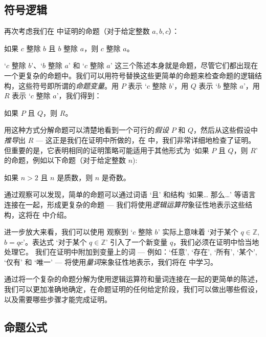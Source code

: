 \subsection*{符号逻辑}

再次考虑我们在  中证明的命题（对于给定整数 $a,b,c$）：

\begin{center}
如果 $c$ 整除 $b$ 且 $b$ 整除 $a$，则 $c$ 整除 $a$。
\end{center}

`$c$ 整除 $b$'、`$b$ 整除 $a$' 和 `$c$ 整除 $a$' 这三个陈述本身就是命题，尽管它们都出现在一个更复杂的命题中。我们可以用符号替换这些更简单的命题来检查命题的逻辑结构，这些符号即所谓的\textit{命题变量}。用 $P$ 表示 `$c$ 整除 $b$'，用 $Q$ 表示 `$b$ 整除 $a$'，用 $R$ 表示 `$c$ 整除 $a$'，我们得到：

\begin{center}
如果 $P$ 且 $Q$，则 $R$。
\end{center}

用这种方式分解命题可以清楚地看到一个可行的\textit{假设} $P$ 和 $Q$，然后从这些假设中\textit{推导}出 $R$ --- 这正是我们在证明中所做的，在  中，我们非常详细地检查了证明。但重要的是，它表明相同的证明策略可能适用于其他形式为 `如果 $P$ 且 $Q$，则 $R$' 的命题，例如以下命题（对于给定整数 $n$):

\begin{center}
如果 $n > 2$ 且 $n$ 是质数，则 $n$ 是奇数。
\end{center}

通过观察可以发现，简单的命题可以通过词语 `且' 和结构 `如果\dots{} 那么\dots{}' 等语言连接在一起，形成更复杂的命题 --- 我们将使用\textit{逻辑运算符}象征性地表示这些结构，这将在  中介绍。

进一步放大来看，我们可以使用  观察到 `$c$ 整除 $b$' 实际上意味着 `对于某个 $q \in \mathbb{Z}$, $b = qc$'。表达式 `对于某个 $q \in \mathbb{Z}$' 引入了一个新变量 $q$，我们必须在证明中恰当地处理它。 我们在证明中附加到变量上的词 --- 例如：`任意', `存在', `所有', `某个', `仅有' 和 `唯一' --- 将使用\textit{量词}来象征性地表示，我们将在  中学习。

通过将一个复杂的命题分解为使用逻辑运算符和量词连接在一起的更简单的陈述，我们可以更加准确地确定，在命题证明的任何给定阶段，我们可以做出哪些假设，以及需要哪些步骤才能完成证明。

\subsection*{命题公式}

